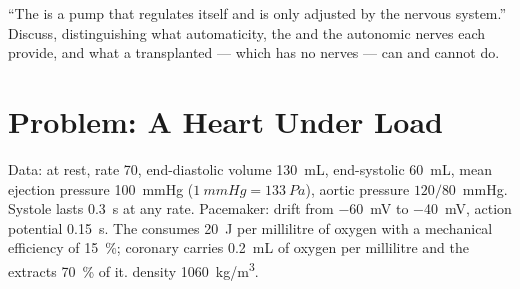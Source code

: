 \begin{exercise}[$\star\star\star$]\label{exo:b2:heart:12}
``The  is a pump that regulates itself and is only adjusted by
the nervous system.'' Discuss, distinguishing what automaticity, the
 and the autonomic nerves each provide, and what
a transplanted  --- which has no nerves --- can and cannot do.
\end{exercise}

\section{Problem: A Heart Under Load}

\begin{problem}
\label{pb:b2:heart:1}
Data: at rest, rate 70, end-diastolic volume \qty{130}{mL},
end-systolic \qty{60}{mL}, mean ejection pressure \qty{100}{mmHg}
($\qty{1}{mmHg} = \qty{133}{Pa}$), aortic pressure $120/80$~mmHg.
Systole lasts \qty{0.3}{s} at any rate. Pacemaker: drift from
\qty{-60}{mV} to \qty{-40}{mV}, action potential \qty{0.15}{s}. The
 consumes \qty{20}{J} per millilitre of oxygen with a
mechanical efficiency of \qty{15}{\%}; coronary  carries
\qty{0.2}{mL} of oxygen per millilitre and the  extracts
\qty{70}{\%} of it.  density \qty{1060}{kg/m^3}.


\end{problem}
